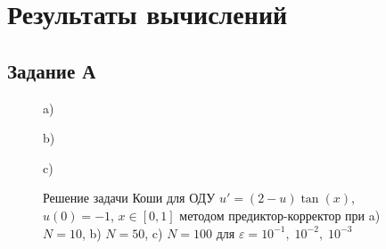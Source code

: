 \documentclass[
11pt,
master, %
subf, %
href, %
colorlinks=true, %
times, %
]{disser}
\begin{document}
\newpage
\section{Результаты вычислений}

\subsection{Задание А}
\begin{figure}[h]
\begin{minipage}[h]{1\linewidth}
 a) \\
\end{minipage}
\vfill
\begin{minipage}[h]{1\linewidth}
 b) \\
\end{minipage}
\vfill
\begin{minipage}[h]{1\linewidth}
 c) \\
\end{minipage}
\vfill
\caption{Решение задачи Коши для ОДУ $u' = (2-u)\tan(x)$, $u(0) = -1$, $x\in [0,1]$ методом предиктор-корректор при a) $N = 10$, b) $N = 50$, c) $N = 100$ для $\varepsilon = 10^{-1},\;10^{-2},\;10^{-3}$}
\label{ris:1}
\end{figure}
\end{document}
